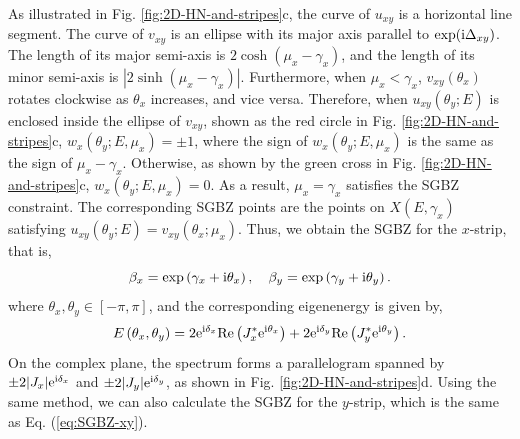 As illustrated in Fig. \ref{fig:2D-HN-and-stripes}c, the curve of
$u_{xy}$ is a horizontal line segment. The curve of $v_{xy}$ is
an ellipse with its major axis parallel to $\exp(\mathrm{i}\Delta_{xy})$.
The length of its major semi-axis is $2\cosh(\mu_{x}-\gamma_{x})$,
and the length of its minor semi-axis is $|2\sinh(\mu_{x}-\gamma_{x})|$.
Furthermore, when $\mu_{x}<\gamma_{x}$, $v_{xy}(\theta_{x})$ rotates
clockwise as $\theta_{x}$ increases, and vice versa. Therefore, when
$u_{xy}(\theta_{y};E)$ is enclosed inside the ellipse of $v_{xy}$,
shown as the red circle in Fig. \ref{fig:2D-HN-and-stripes}c, $w_{x}(\theta_{y};E,\mu_{x})=\pm1$,
where the sign of $w_{x}(\theta_{y};E,\mu_{x})$ is the same as the
sign of $\mu_{x}-\gamma_{x}$. Otherwise, as shown by the green cross
in Fig. \ref{fig:2D-HN-and-stripes}c, $w_{x}(\theta_{y};E,\mu_{x})=0$.
As a result, $\mu_{x}=\gamma_{x}$ satisfies the SGBZ constraint.
The corresponding SGBZ points are the points on $X(E,\gamma_{x})$
satisfying $u_{xy}(\theta_{y};E)=v_{xy}(\theta_{x};\mu_{x})$. Thus,
we obtain the SGBZ for the $x$-strip, that is, 
\begin{equation}
\beta_{x}=\exp\left(\gamma_{x}+\mathrm{i}\theta_{x}\right),\quad\beta_{y}=\exp\left(\gamma_{y}+\mathrm{i}\theta_{y}\right).\label{eq:SGBZ-xy}
\end{equation}
where $\theta_{x},\theta_{y}\in[-\pi,\pi]$, and the corresponding
eigenenergy is given by, 
\begin{equation}
E\left(\theta_{x},\theta_{y}\right)=2\mathrm{e}^{\mathrm{i}\delta_{x}}\text{Re}\left(J_{x}^{*}\mathrm{e}^{\mathrm{i}\theta_{x}}\right)+2\mathrm{e}^{\mathrm{i}\delta_{y}}\text{Re}\left(J_{y}^{*}\mathrm{e}^{\mathrm{i}\theta_{y}}\right).\label{eq:SGBZ-xy-E}
\end{equation}
On the complex plane, the spectrum forms a parallelogram spanned by
$\pm2|J_{x}|\mathrm{e}^{\mathrm{i}\delta_{x}}$ and $\pm2|J_{y}|\mathrm{e}^{\mathrm{i}\delta_{y}}$,
as shown in Fig. \ref{fig:2D-HN-and-stripes}d. Using the same method,
we can also calculate the SGBZ for the $y$-strip, which is the same
as Eq. (\ref{eq:SGBZ-xy}).

